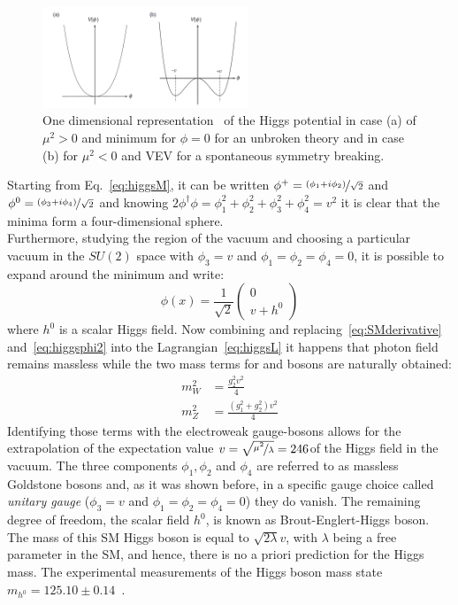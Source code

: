 \begin{figure}[h]
\centering
\includegraphics[width=0.55\textwidth]{Figures/c1/higgsPotential}
\caption{One dimensional representation~\cite{thomson_2013} of the Higgs potential in case (a) of $\mu^2 > 0$ and minimum for $\phi = 0$ for an unbroken theory and in case (b) for $\mu^2 < 0$ and VEV for a spontaneous symmetry breaking.}
\label{fig:mexico}
\end{figure}

Starting from Eq.~\ref{eq:higgsM}, it can be written $\phi^+=\nicefrac{(\phi_1 + i\phi_2)}{\sqrt{2}}$ and $\phi^0=\nicefrac{(\phi_3 + i\phi_4)}{\sqrt{2}}$ and knowing $2\phi^\dag \phi = \phi^2_1+\phi^2_2+ \phi^2_3+ \phi^2_4 = v^2$ it is clear that the minima form a four-dimensional sphere.\\
Furthermore, studying the region of the vacuum and choosing a particular vacuum in the $SU(2)$ space with $\phi_3 = v$ and $\phi_1=\phi_2=\phi_4=0$, it is possible to expand around the minimum and write:
\begin{equation}
\label{eq:higgsphi2}
\phi(x) = \frac{1}{\sqrt{2}}\begin{pmatrix}
0\\
v+ h^0
\end{pmatrix}
\end{equation}
where $h^0$ is a scalar Higgs field. Now combining and replacing~\ref{eq:SMderivative} and~\ref{eq:higgsphi2} into the Lagrangian~\ref{eq:higgsL} it happens that photon field remains massless while the two mass terms for \PW and \PZ bosons are naturally obtained:
\begin{align}
m^2_W &= \frac{g_2^2v^2}{4}\label{eq:massW}\\
m^2_Z &= \frac{(g_1^2+g_2^2)v^2}{4}\label{eq:massZ}
\end{align}
Identifying those terms with the electroweak gauge-bosons allows for the extrapolation of the expectation value $v = \sqrt{\nicefrac{\mu^2}{\lambda}} = 246$\GeV of the Higgs field in the vacuum.
The three components $\phi_1,\phi_2$ and $\phi_4$ are referred to as massless Goldstone bosons and, as it was shown before, in a specific gauge choice called \emph{unitary gauge} ($\phi_3 = v$ and $\phi_1=\phi_2=\phi_4=0$) they do vanish. The remaining degree of freedom, the scalar field $h^0$, is known as Brout-Englert-Higgs boson. The mass of this SM Higgs boson is equal to $\sqrt{2\lambda}v$, with $\lambda$ being a free parameter in the SM, and
hence, there is no a priori prediction for the Higgs mass. The experimental measurements of the Higgs boson mass state  $m_{h^0}=125.10\pm0.14$\GeV~\cite{pdgw}. 

